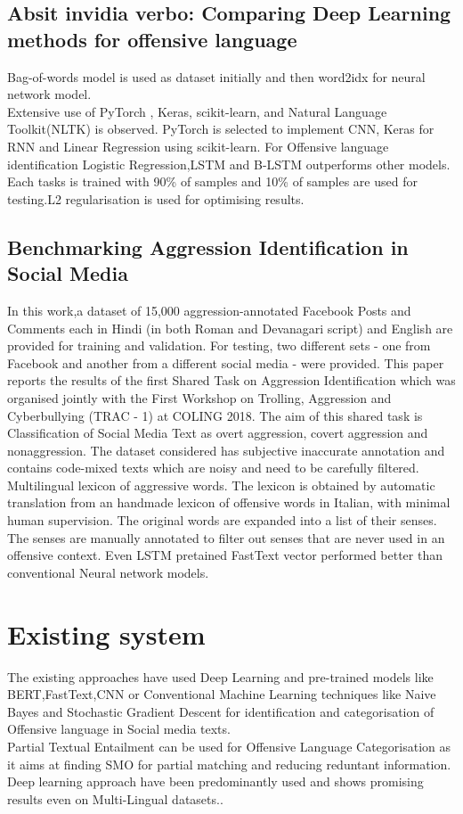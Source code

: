 \documentclass[12pt,a4paper]{article}
\begin{document}
\subsection{ Absit invidia verbo: Comparing Deep Learning methods for offensive language\cite{comparingDeepLearning}}
Bag-of-words model is used as dataset initially and then word2idx for neural network model.\\ 
Extensive use of PyTorch , Keras, scikit-learn, and Natural Language Toolkit(NLTK) is observed. PyTorch is selected to implement CNN, Keras for RNN and Linear Regression using scikit-learn. For Offensive language identification Logistic Regression,LSTM and B-LSTM outperforms other models.\\
 Each tasks is trained with 90\% of samples and 10\% of samples are used for testing.L2 regularisation is used for optimising results.
\subsection{Benchmarking Aggression Identification in Social Media\cite{benchmarkAggressionIden}}
In this work,a dataset of 15,000 aggression-annotated Facebook Posts and Comments each in Hindi (in both Roman and Devanagari script) and English are provided for training and validation. For testing, two different sets - one from Facebook and another from a different social media - were provided.
This paper reports the results of the first Shared Task on Aggression Identification which was organised
jointly with the First Workshop on Trolling, Aggression and Cyberbullying (TRAC - 1) at COLING 2018.
The aim of this shared task is Classification of Social Media Text as overt aggression, covert aggression and nonaggression.
The dataset considered has subjective inaccurate annotation and contains code-mixed texts which are noisy and need to be carefully filtered.\\
Multilingual lexicon of aggressive words. The lexicon is obtained by automatic translation from an handmade lexicon of offensive words in Italian, with minimal human supervision. The original words are expanded into a list of their senses. The senses are manually annotated to filter out senses that are
never used in an offensive context.
Even LSTM pretained FastText vector performed better than conventional Neural network models.
\newpage
\section{Existing system}
	 The existing approaches have used Deep Learning and pre-trained models like BERT,FastText,CNN or Conventional Machine Learning techniques like Naive Bayes and Stochastic Gradient Descent for identification and categorisation of Offensive language in Social media texts\cite{ssnNLPSemEvalT6}\cite{stateofartSemEvalT6}.\\
 Partial Textual Entailment can be used for Offensive Language Categorisation as it aims at finding SMO for partial matching and reducing reduntant information.\cite{partialTESocial}\\
 Deep learning approach have been predominantly used and shows promising results even on Multi-Lingual datasets.\cite{benchmarkAggressionIden}. 	
\end{document}
